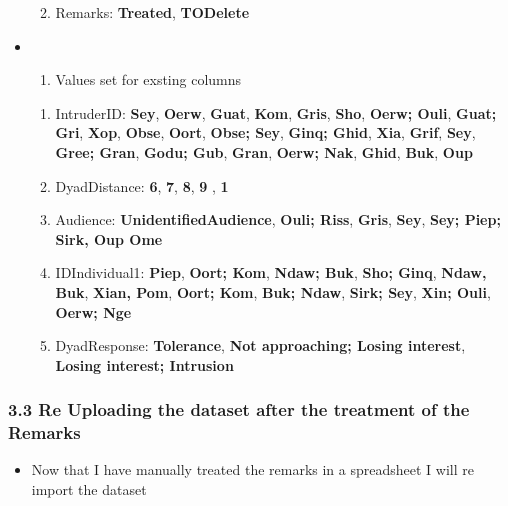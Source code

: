 \documentclass[
]{article}
\providecommand{\tightlist}{%
  \setlength{\itemsep}{0pt}\setlength{\parskip}{0pt}}
\begin{document}
\begin{itemize}
  \begin{enumerate}
  \def\labelenumi{\alph{enumi}.}
  \setcounter{enumi}{3}
  \tightlist
  \item
    Remarks: \textbf{Treated}, \textbf{TODelete}
  \end{enumerate}
\item
  \begin{enumerate}
  \def\labelenumi{\arabic{enumi}.}
  \setcounter{enumi}{3}
  \tightlist
  \item
    Values set for exsting columns
  \end{enumerate}

  \begin{enumerate}
  \def\labelenumi{\alph{enumi}.}
  \item
    IntruderID: \textbf{Sey}, \textbf{Oerw}, \textbf{Guat},
    \textbf{Kom}, \textbf{Gris}, \textbf{Sho}, \textbf{Oerw; Ouli},
    \textbf{Guat; Gri}, \textbf{Xop}, \textbf{Obse}, \textbf{Oort},
    \textbf{Obse; Sey}, \textbf{Ginq; Ghid}, \textbf{Xia},
    \textbf{Grif}, \textbf{Sey}, \textbf{Gree; Gran}, \textbf{Godu;
    Gub}, \textbf{Gran}, \textbf{Oerw; Nak}, \textbf{Ghid},
    \textbf{Buk}, \textbf{Oup}
  \item
    DyadDistance: \textbf{6}, \textbf{7}, \textbf{8}, \textbf{9} ,
    \textbf{1}
  \item
    Audience: \textbf{UnidentifiedAudience}, \textbf{Ouli; Riss},
    \textbf{Gris}, \textbf{Sey}, \textbf{Sey; Piep; Sirk, Oup Ome}
  \item
    IDIndividual1: \textbf{Piep}, \textbf{Oort; Kom}, \textbf{Ndaw;
    Buk}, \textbf{Sho; Ginq}, \textbf{Ndaw, Buk}, \textbf{Xian, Pom},
    \textbf{Oort; Kom}, \textbf{Buk; Ndaw}, \textbf{Sirk; Sey},
    \textbf{Xin; Ouli}, \textbf{Oerw; Nge}
  \item
    DyadResponse: \textbf{Tolerance}, \textbf{Not approaching; Losing
    interest}, \textbf{Losing interest; Intrusion}
  \end{enumerate}
\end{itemize}

\hypertarget{re-uploading-the-dataset-after-the-treatment-of-the-remarks}{%
\subsubsection{3.3 Re Uploading the dataset after the treatment of the
Remarks}\label{re-uploading-the-dataset-after-the-treatment-of-the-remarks}}

\begin{itemize}
\tightlist
\item
  Now that I have manually treated the remarks in a spreadsheet I will
  re import the dataset
\end{itemize}
\end{document}
